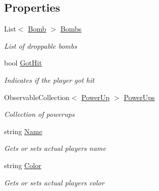 \subsection*{Properties}
\begin{DoxyCompactItemize}
\item 
List$<$ \mbox{\hyperlink{class_bomberman_1_1_model_1_1_bomb}{Bomb}} $>$ \mbox{\hyperlink{class_bomberman_1_1_model_1_1_player_abc2e7df14d0287f8a280f01cf17f2786}{Bombs}}
\begin{DoxyCompactList}\small\item\em List of droppable bombs \end{DoxyCompactList}\item 
bool \mbox{\hyperlink{class_bomberman_1_1_model_1_1_player_a079b3fc434620204adbccaf90d3e6ff2}{Got\+Hit}}
\begin{DoxyCompactList}\small\item\em Indicates if the player got hit \end{DoxyCompactList}\item 
Observable\+Collection$<$ \mbox{\hyperlink{namespace_bomberman_1_1_model_a698c97744bc885fe16cc6f385fc501ef}{Power\+Up}} $>$ \mbox{\hyperlink{class_bomberman_1_1_model_1_1_player_a0a61512a43b98f8545923bade35bf371}{Power\+Ups}}
\begin{DoxyCompactList}\small\item\em Collection of powerups \end{DoxyCompactList}\item 
string \mbox{\hyperlink{class_bomberman_1_1_model_1_1_player_ad756da2015e4614e2550b2425e9fdc31}{Name}}
\begin{DoxyCompactList}\small\item\em Gets or sets actual player\textquotesingle{}s name \end{DoxyCompactList}\item 
string \mbox{\hyperlink{class_bomberman_1_1_model_1_1_player_abecd3e3bb2aba7b79826b1540bea0e1a}{Color}}
\begin{DoxyCompactList}\small\item\em Gets or sets actual player\textquotesingle{}s color \end{DoxyCompactList}\item 

\end{DoxyCompactItemize}
